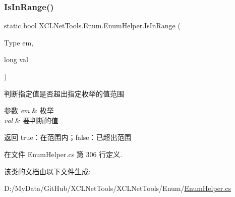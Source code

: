 \subsubsection{\texorpdfstring{Is\+In\+Range()}{IsInRange()}}
{\footnotesize\ttfamily static bool X\+C\+L\+Net\+Tools.\+Enum.\+Enum\+Helper.\+Is\+In\+Range (\begin{DoxyParamCaption}\item[{Type}]{em,  }\item[{long}]{val }\end{DoxyParamCaption})\hspace{0.3cm}{\ttfamily [static]}}



判断指定值是否超出指定枚举的值范围 


\begin{DoxyParams}{参数}
{\em em} & 枚举\\
\hline
{\em val} & 要判断的值\\
\hline
\end{DoxyParams}
\begin{DoxyReturn}{返回}
true：在范围内；false：已超出范围
\end{DoxyReturn}


在文件 Enum\+Helper.\+cs 第 306 行定义.



该类的文档由以下文件生成\+:\begin{DoxyCompactItemize}
\item 
D\+:/\+My\+Data/\+Git\+Hub/\+X\+C\+L\+Net\+Tools/\+X\+C\+L\+Net\+Tools/\+Enum/\hyperlink{_enum_helper_8cs}{Enum\+Helper.\+cs}\end{DoxyCompactItemize}

